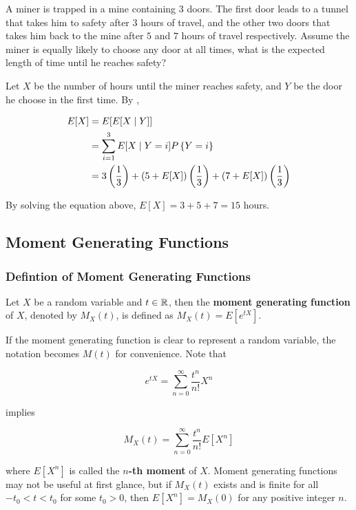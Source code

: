 \documentclass[a4paper,12pt]{article}
\begin{document}
\begin{exm}
  A miner is trapped in a mine containing $3$ doors. The first door leads to a tunnel that takes him to safety after $3$ hours of travel, and the other two doors that takes him back to the mine after $5$ and $7$ hours of travel respectively. Assume the miner is equally likely to choose any door at all times, what is the expected length of time until he reaches safety?\n

  \ans Let $X$ be the number of hours until the miner reaches safety, and $Y$ be the door he choose in the first time. By \rthm[\sctr{1}],

  $$\begin{aligned}[t]
    E[X]&=E[E[X\mid Y]]\\
    &=\sum_{i=1}^{3}E[X\mid Y=i]P\left\{ Y=i\right\}\\
    &=3\left( \frac{1}{3}\right)+(5+E[X])\left( \frac{1}{3}\right)+(7+E[X])\left( \frac{1}{3}\right)
  \end{aligned}$$\s

  By solving the equation above, $E[X]=3+5+7=15$ hours.
\end{exm}

\subsection{Moment Generating Functions}
\subsubsection{Defintion of Moment Generating Functions}
\begin{dft}
  Let $X$ be a random variable and $t\in\mathbb{R}$, then the \textbf{moment generating function} of $X$, denoted by $M_{X}(t)$, is defined as $M_{X}(t)=E[e^{tX}]$.
\end{dft}\n

If the moment generating function is clear to represent a random variable, the notation becomes $M(t)$ for convenience. Note that

$$e^{tX}=\sum_{n=0}^{\infty}\frac{t^{n}}{n!}X^{n}$$\s

implies

$$M_{X}(t)=\sum_{n=0}^{\infty}\frac{t^{n}}{n!}E[X^{n}]$$\s

where $E[X^{n}]$ is called the \textbf{$n$-th moment} of $X$. Moment generating functions may not be useful at first glance, but if $M_{X}(t)$ exists and is finite for all $-t_{0}<t<t_{0}$ for some $t_{0}>0$, then $E[X^{n}]=M_{X}(0)$ for any positive integer $n$.
\end{document}
